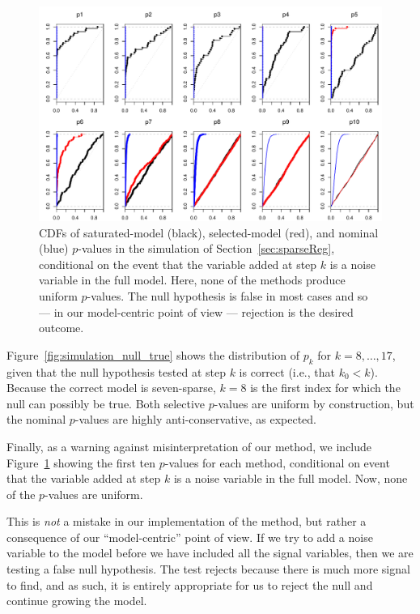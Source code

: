 \documentclass{article}
\begin{document}
\begin{figure}
  \centering
  \includegraphics[width=.8\textwidth]{figs/simulation_snr_5_alpha_05_noise_var.pdf}
  \caption{CDFs of saturated-model (black), selected-model (red), and nominal (blue) $p$-values in the simulation of Section~\ref{sec:sparseReg}, conditional on the event that the variable added at step $k$ is a noise variable in the full model. Here, none of the methods produce uniform $p$-values. The null hypothesis is false in most cases and so --- in our model-centric point of view --- rejection is the desired outcome.}
  \label{fig:simulation_noise_var}
\end{figure}

Figure~\ref{fig:simulation_null_true} shows the distribution of $p_k$ for $k = 8, \ldots, 17$, given that the null hypothesis tested at step $k$ is correct (i.e., that $k_0< k$). Because the correct model is seven-sparse, $k=8$ is the first index for which the null can possibly be true. Both selective $p$-values are uniform by construction, but the nominal $p$-values are highly anti-conservative, as expected.

Finally, as a warning against misinterpretation of our method, we include Figure~\ref{fig:simulation_noise_var} showing the first ten $p$-values for each method, conditional on event that the variable added at step $k$ is a noise variable in the full model. Now, none of the $p$-values are uniform. 

This is {\em not} a mistake in our implementation of the method, but rather a consequence of our ``model-centric'' point of view. If we try to add a noise variable to the model before we have included all the signal variables, then we are testing a false null hypothesis. The test rejects because there is much more signal to find, and as such, it is entirely appropriate for us to reject the null and continue growing the model.
\end{document}
